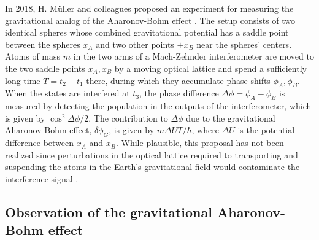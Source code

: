 \documentclass[reprint,
nofootinbib,
amsmath,amssymb,
aps]{revtex4-1}
\begin{document}
In 2018, H. M\"{u}ller and colleagues proposed an experiment for measuring the gravitational analog of the Aharonov-Bohm effect \cite{hohensee2012force}. The setup  
consists of two identical spheres whose combined gravitational potential has a saddle point between the spheres $x_A$ and two other points $\pm x_B$ near the spheres' centers. Atoms of mass $m$ in the two arms of a Mach-Zehnder interferometer are moved to the two saddle points $x_A,x_B$ by a moving optical lattice and spend a sufficiently long time $T = t_2- t_1$ there, during which they accumulate phase shifts $\phi_A, \phi_B$. When the states are interfered at $t_3$, the phase difference $\Delta \phi = \phi_A - \phi_B$ is measured by detecting the population in the outputs of the interferometer, which is given by $\cos^2\Delta \phi/2$. The contribution to $\Delta \phi$ due to the gravitational Aharonov-Bohm effect, $\delta \phi_G$, is given by $m\Delta U T/\hbar$, where $\Delta U$ is the potential difference between $x_A$ and $x_B$.  While plausible, this proposal has not been realized since perturbations in the optical lattice required to transporting and suspending the atoms in the Earth's gravitational field would contaminate the interference signal \cite{roura2022quantum}.  










\subsection{Observation of the gravitational Aharonov-Bohm effect}
\end{document}
